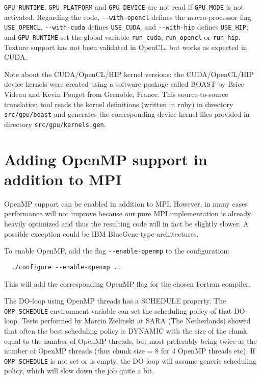 \texttt{GPU\_RUNTIME}, \texttt{GPU\_PLATFORM} and \texttt{GPU\_DEVICE}
are not read if \texttt{GPU\_MODE} is not activated.
Regarding the code, \texttt{-{}-with-opencl} defines the
macro-processor flag \texttt{USE\_OPENCL}, \texttt{-{}-with-cuda}
defines \texttt{USE\_CUDA}, and \texttt{-{}-with-hip}
defines \texttt{USE\_HIP}; and \texttt{GPU\_RUNTIME} set the global
variable \texttt{run\_cuda}, \texttt{run\_opencl} or \texttt{run\_hip}.
Texture support has not been validated in OpenCL, but works as
expected in CUDA.\newline


Note about the CUDA/OpenCL/HIP kernel versions: the CUDA/OpenCL/HIP device kernels were
created using a software package called BOAST \citep{Videau2013} by Brice Videau and Kevin Pouget from Grenoble, France.
This source-to-source translation tool reads the kernel definitions (written in ruby) in directory \texttt{src/gpu/boast}
and generates the corresponding device kernel files provided in directory \texttt{src/gpu/kernels.gen}.


\section{Adding OpenMP support in addition to MPI}

OpenMP support can be enabled in addition to MPI. However, in many
cases performance will not improve because our pure MPI implementation
is already heavily optimized and thus the resulting code will in fact
be slightly slower. A possible exception could be IBM BlueGene-type
architectures.\newline


\noindent
To enable OpenMP,  add the flag \texttt{-{}-enable-openmp} to the configuration:
{\small
\begin{verbatim}
  ./configure --enable-openmp ..
\end{verbatim}
}
\noindent
This will add the corresponding OpenMP flag for the chosen Fortran compiler.\newline


The DO-loop using OpenMP threads has a SCHEDULE property. The \texttt{OMP\_SCHEDULE}
environment variable can set the scheduling policy of that DO-loop.
Tests performed by Marcin Zielinski at SARA (The Netherlands) showed
that often the best scheduling policy is DYNAMIC with the size of
the chunk equal to the number of OpenMP threads, but most preferably
being twice as the number of OpenMP threads (thus chunk size = 8 for
4 OpenMP threads etc). If \texttt{OMP\_SCHEDULE} is not set or is empty, the
DO-loop will assume generic scheduling policy, which will slow down
the job quite a bit.


